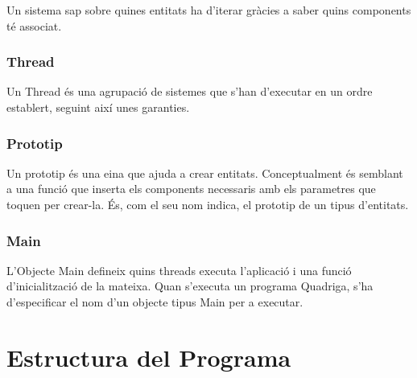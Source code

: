 Un sistema sap sobre quines entitats ha d'iterar gràcies a saber quins components té associat.

\subsubsection{Thread}

Un Thread és una agrupació de sistemes que s'han d'executar en un ordre establert, seguint així unes garanties.

\subsubsection{Prototip}

Un prototip és una eina que ajuda a crear entitats. Conceptualment és semblant a una funció que inserta els components necessaris amb els parametres que toquen per crear-la. És, com el seu nom indica, el prototip de un tipus d'entitats.

\subsubsection{Main}

L'Objecte Main defineix quins threads executa l'aplicació i una funció d'inicialització de la mateixa. Quan s'executa un programa Quadriga, s'ha d'especificar el nom d'un objecte tipus Main per a executar.

\section{Estructura del Programa}

